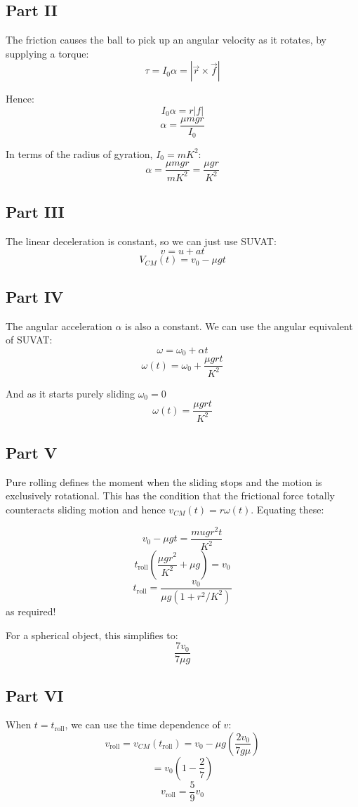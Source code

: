 \subsection{Part II}
The friction causes the ball to pick up an angular velocity as it rotates, by supplying a torque:
\[
    \tau = I_0 \alpha = | \vec{r} \times \vec{f}|
\]

Hence:
\[
    I_0 \alpha = r |f|
\]
\[
    \alpha = \frac{\mu m g r}{I_0}
\]

In terms of the radius of gyration, $I_0 = mK^2$:
\[
    \alpha = \frac{\mu m g r}{m K^2} = \frac{\mu g r}{K^2}
\]

\subsection{Part III}
The linear deceleration  is constant, so we can just use SUVAT:
\[
    v = u + at
\]
\[
    V_{CM}(t) = v_0 - \mu gt
\]

\subsection{Part IV}
The angular acceleration $\alpha$ is also a constant. We can use the angular equivalent of SUVAT:
\[
    \omega = \omega_0 + \alpha t
\]
\[
    \omega(t) = \omega_0 + \frac{\mu g r t}{K^2}
\]

And as it starts purely sliding $\omega_0 = 0$
\[
    \omega(t) = \frac{\mu g r t}{K^2}
\]

\subsection{Part V}
Pure rolling defines the moment when the sliding stops and the motion is exclusively rotational. This has the condition that the frictional force totally counteracts sliding motion and hence $v_{CM}(t) = r \omega(t)$. Equating these:

\[
    v_0 - \mu g t = \frac{mu g r^2 t}{K^2}
\]
\[
    t_\text{roll} \left(\frac{\mu g r^2}{K^2} + \mu g\right) = v_0
\]
\[
    t_\text{roll} = \frac{v_0}{\mu g \left(1 + r^2/K^2\right)}
\]
as required!

For a spherical object, this simplifies to:
\[
    \frac{7 v_0}{7 \mu g}
\]


\subsection{Part VI}
When $t = t_\text{roll}$, we can use the time dependence of $v$:
\[
    v_\text{roll} = v_{CM}(t_\text{roll}) = v_0 - \mu g \left(\frac{2v_0}{7g \mu}\right)
\]
\[
    = v_0 \left(1 - \frac{2}{7}\right)
\]
\[
    v_\text{roll} = \frac{5}{9}v_0
\]

